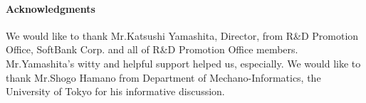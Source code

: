 \documentclass[runningheads]{llncs}
\begin{document}
\paragraph{Acknowledgments}
We would like to thank Mr.Katsushi Yamashita, Director, from R\&D Promotion Office, SoftBank Corp. and  all of R\&D Promotion Office members. Mr.Yamashita's witty and helpful support helped us, especially.
We would like to thank Mr.Shogo Hamano from Department of Mechano-Informatics, the University of Tokyo for his informative discussion.
\clearpage


\end{document}
